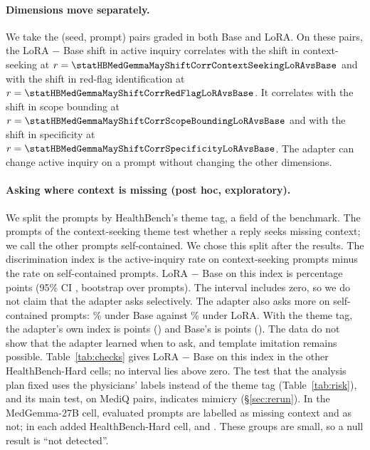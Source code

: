 \documentclass{article}
\newcommand{\hbhard}{HealthBench-Hard}
\begin{document}
\paragraph{Dimensions move separately.} We take the \statHBMedGemmaMayShiftCorrNLoRAvsBase{} (seed, prompt) pairs graded
in both Base and LoRA. On these pairs, the LoRA $-$ Base shift in active inquiry correlates with
the shift in context-seeking at $r = \statHBMedGemmaMayShiftCorrContextSeekingLoRAvsBase$ and with the shift in red-flag
identification at $r = \statHBMedGemmaMayShiftCorrRedFlagLoRAvsBase$. It correlates with the shift in scope bounding at
$r = \statHBMedGemmaMayShiftCorrScopeBoundingLoRAvsBase$ and with the shift in specificity at
$r = \statHBMedGemmaMayShiftCorrSpecificityLoRAvsBase$. The adapter can change active inquiry on a prompt without
changing the other dimensions.

\paragraph{Asking where context is missing (post hoc, exploratory).} We split the
\statHBMedGemmaMayPrompts{} prompts by HealthBench's theme tag, a field of the benchmark. The
\statHBMedGemmaMayActiveInquiryNeedsInfoThemePosPrompts{} prompts of the context-seeking theme test whether a reply seeks missing
context; we call the other \statHBMedGemmaMayActiveInquiryNeedsInfoThemeNegPrompts{} prompts self-contained. We chose this split after
the results. The discrimination index is the active-inquiry rate on context-seeking prompts minus
the rate on self-contained prompts. LoRA $-$ Base on this index is
\statHBMedGemmaMayActiveInquiryNeedsInfoThemeIndexLoRAvsBaseDiff{} percentage points (95\% CI \statHBMedGemmaMayActiveInquiryNeedsInfoThemeIndexLoRAvsBaseCI, bootstrap
over prompts). The interval includes zero, so we do not claim that the adapter asks selectively.
The adapter also asks more on self-contained prompts: \statHBMedGemmaMayActiveInquiryNeedsInfoThemeNegRateBase\% under Base against
\statHBMedGemmaMayActiveInquiryNeedsInfoThemeNegRateLoRA\% under LoRA. With the theme tag, the
adapter's own index is \statHBMedGemmaMayActiveInquiryNeedsInfoThemeIndexLoRA{} points (\statHBMedGemmaMayActiveInquiryNeedsInfoThemeIndexLoRACI) and Base's is
\statHBMedGemmaMayActiveInquiryNeedsInfoThemeIndexBase{} points (\statHBMedGemmaMayActiveInquiryNeedsInfoThemeIndexBaseCI). The data do not show that the adapter learned
when to ask, and template imitation remains possible. Table~\ref{tab:checks} gives LoRA $-$ Base on
this index in the other \hbhard{} cells; no interval lies above zero. The test that the analysis plan
fixed uses the physicians' labels instead of the theme tag (Table~\ref{tab:risk}), and its main
test, on MediQ pairs, indicates mimicry (\S\ref{sec:rerun}).
In the MedGemma-27B cell, \statHBMedGemmaMayActiveInquiryNeedsInfoPhysicianPosPrompts{} evaluated prompts
are labelled as missing context and \statHBMedGemmaMayActiveInquiryNeedsInfoPhysicianNegPrompts{} as
not; in each added \hbhard{} cell, \statHBMistralJulActiveInquiryNeedsInfoPhysicianPosPrompts{} and
\statHBMistralJulActiveInquiryNeedsInfoPhysicianNegPrompts. These groups are small, so a null result is
``not detected''.
\end{document}
